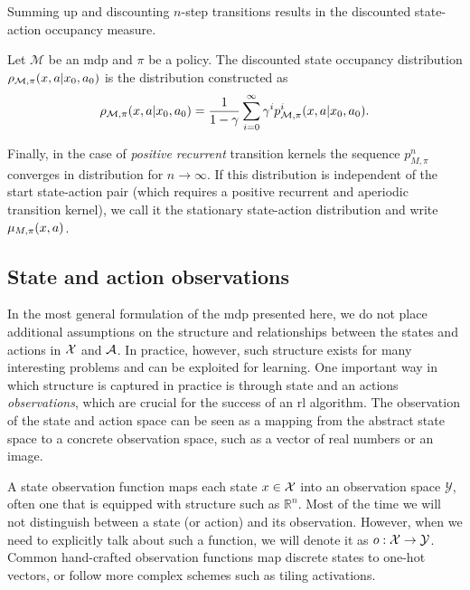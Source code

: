 Summing up and discounting $n$-step transitions results in the discounted state-action occupancy measure.

\begin{definition}
    Let $\mathcal{M}$ be an \ac{mdp} and $\pi$ be a policy.
    The discounted state occupancy distribution $\rho_{\mathcal{M},\pi}(x,a|x_0,a_0)$ is the distribution constructed as $$\rho_{\mathcal{M},\pi}(x,a|x_0,a_0) = \frac{1}{1 - \gamma} \sum_{i=0}^\infty \gamma^i p^i_{\mathcal{M},\pi}(x,a|x_0,a_0).$$
\end{definition}

Finally, in the case of \emph{positive recurrent} transition kernels the sequence $p^n_{M,\pi}$ converges in distribution for $n \rightarrow \infty$.
If this distribution is independent of the start state-action pair (which requires a positive recurrent and aperiodic transition kernel), we call it the stationary state-action distribution and write $\mu_{M,\pi}(x,a)$.

\subsection{State and action observations}

In the most general formulation of the \ac{mdp}   presented here, we do not place additional assumptions on the structure and relationships between the states and actions in $\mathcal{X}$ and $\mathcal{A}$.
In practice, however, such structure exists for many interesting problems and can be exploited for learning.
One important way in which structure is captured in practice is through state and an actions \emph{observations}, which are crucial for the success of an \ac{rl} algorithm.
The observation of the state and action space can be seen as a mapping from the abstract state space to a concrete observation space, such as a vector of real numbers or an image.

A state observation function maps each state $x\in\mathcal{X}$ into an observation space $\mathcal{Y}$, often one that is equipped with structure such as $\mathbb{R}^n$.
Most of the time we will not distinguish between a state (or action) and its observation.
However, when we need to explicitly talk about such a function, we will denote it as $o: \mathcal{X} \rightarrow \mathcal{Y}$.
Common hand-crafted observation functions map discrete states to one-hot vectors, or follow more complex schemes such as tiling activations.

